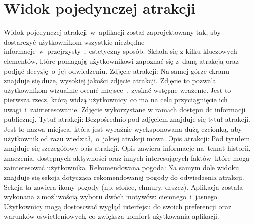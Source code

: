 \section{Widok pojedynczej atrakcji}
\label{sec:atrakcjawidok}
Widok pojedynczej atrakcji~w~aplikacji został zaprojektowany tak, aby dostarczyć
użytkownikom wszystkie niezbędne informacje~w~przejrzysty~i~estetyczny sposób.
Składa się z kilku kluczowych elementów, które pomagają użytkownikowi zapoznać się z~daną atrakcją oraz podjąć decyzję~o~jej odwiedzeniu.
\newline
Zdjęcie atrakcji:
Na samej górze ekranu znajduje się duże, wysokiej jakości zdjęcie atrakcji.
Zdjęcie to pozwala użytkownikom wizualnie ocenić miejsce~i~zyskać wstępne wrażenie. 
Jest to pierwsza rzecz, którą widzą użytkownicy, co ma na celu przyciągnięcie ich uwagi~i~zainteresowanie.
Zdjęcie wykorzystane w ramach dostępu do informacji publicznej.
\newline
Tytuł atrakcji:
Bezpośrednio pod zdjęciem znajduje się tytuł atrakcji. Jest to nazwa miejsca, która jest
wyraźnie wyeksponowana dużą czcionką, aby użytkownik od razu wiedział,~o~jakiej atrakcji mowa.
\newline
Opis atrakcji:
Pod tytułem znajduje się szczegółowy opis atrakcji.
Opis zawiera informacje na~temat historii, znaczenia, dostępnych aktywności oraz innych interesujących faktów, które mogą
zainteresować użytkownika.
\newline
Rekomendowana pogoda:
Na samym dole widoku znajduje się sekcja dotycząca rekomendowanej
pogody do odwiedzenia atrakcji. Sekcja ta zawiera ikony pogody (np. słońce, chmury, deszcz).
\newline
Aplikacja została wykonana z możliwością wyboru dwóch motywów: ciemnego~i~jasnego.
Użytkownicy mogą dostosować wygląd interfejsu do swoich preferencji oraz warunków oświetleniowych, co zwiększa komfort użytkowania aplikacji.

